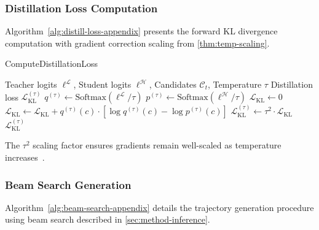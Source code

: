 \subsubsection{Distillation Loss Computation}
\label{app:distill-loss-alg}

Algorithm~\ref{alg:distill-loss-appendix} presents the forward KL divergence computation with gradient correction scaling from \autoref{thm:temp-scaling}.

\begin{algorithm}[H]
    \caption{ComputeDistillationLoss}
    \label{alg:distill-loss-appendix}
    \begin{algorithmic}
        \Require Teacher logits $\boldsymbol{\ell}^{\mathcal{L}}$, Student logits $\boldsymbol{\ell}^{\mathcal{H}}$, Candidates $\mathcal{C}_t$, Temperature $\tau$
        \Ensure Distillation loss $\mathcal{L}_{\text{KL}}^{(\tau)}$
        \State $q^{(\tau)} \gets \text{Softmax}(\boldsymbol{\ell}^{\mathcal{L}} / \tau)$ 
        \State $p^{(\tau)} \gets \text{Softmax}(\boldsymbol{\ell}^{\mathcal{H}} / \tau)$ 
        \State $\mathcal{L}_{\text{KL}} \gets 0$
         
        \State $\mathcal{L}_{\text{KL}} \gets \mathcal{L}_{\text{KL}} + q^{(\tau)}(c) \cdot [\log q^{(\tau)}(c) - \log p^{(\tau)}(c)]$
        \EndIf
        \EndFor
        \State $\mathcal{L}_{\text{KL}}^{(\tau)} \gets \tau^2 \cdot \mathcal{L}_{\text{KL}}$ 
        \State \Return $\mathcal{L}_{\text{KL}}^{(\tau)}$
    \end{algorithmic}
\end{algorithm}

The $\tau^2$ scaling factor ensures gradients remain well-scaled as temperature increases~\cite{hintonDistillingKnowledgeNeural2015}.


\subsubsection{Beam Search Generation}
\label{app:beam-search-alg}

Algorithm~\ref{alg:beam-search-appendix} details the trajectory generation procedure using beam search described in \autoref{sec:method-inference}.

